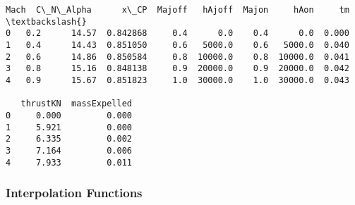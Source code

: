 \documentclass[11pt]{article}
\begin{document}
    \begin{Verbatim}[commandchars=\\\{\}]
   Mach  C\_N\_Alpha      x\_CP  Majoff   hAjoff  Majon     hAon     tm  \textbackslash{}
0   0.2      14.57  0.842868     0.4      0.0    0.4      0.0  0.000
1   0.4      14.43  0.851050     0.6   5000.0    0.6   5000.0  0.040
2   0.6      14.86  0.850584     0.8  10000.0    0.8  10000.0  0.041
3   0.8      15.16  0.848138     0.9  20000.0    0.9  20000.0  0.042
4   0.9      15.67  0.851823     1.0  30000.0    1.0  30000.0  0.043

   thrustKN  massExpelled
0     0.000         0.000
1     5.921         0.000
2     6.335         0.002
3     7.164         0.006
4     7.933         0.011
    \end{Verbatim}

    \hypertarget{interpolation-functions}{%
\subsubsection{Interpolation Functions}\label{interpolation-functions}}
\end{document}
